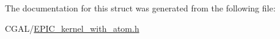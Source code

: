 The documentation for this struct was generated from the following file\+:\begin{DoxyCompactItemize}
\item 
C\+G\+A\+L/\hyperlink{EPIC__kernel__with__atom_8h}{E\+P\+I\+C\+\_\+kernel\+\_\+with\+\_\+atom.\+h}\end{DoxyCompactItemize}
